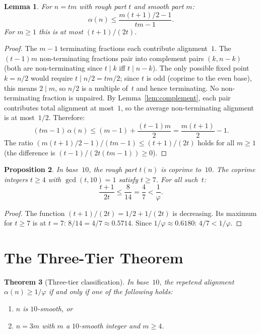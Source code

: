 \documentclass[12pt]{amsart}
\newtheorem{theorem}{Theorem}
\newtheorem{lemma}[theorem]{Lemma}
\newtheorem{proposition}[theorem]{Proposition}
\theoremstyle{definition}
\theoremstyle{remark}
\begin{document}
\begin{lemma}\label{lem:upper-bound}
For $n = tm$ with rough part $t$ and smooth part $m$:
\[
\alpha(n) \le \frac{m(t{+}1)/2 - 1}{tm - 1}.
\]
For $m \ge 1$ this is at most $(t{+}1)/(2t)$.
\end{lemma}

\begin{proof}
The $m - 1$ terminating fractions each contribute
alignment~$1$. The $(t{-}1)m$ non-terminating fractions
pair into complement pairs $(k, n{-}k)$ (both are
non-terminating since $t \mid k$ iff $t \mid n{-}k$).
The only possible fixed point $k = n/2$ would require
$t \mid n/2 = tm/2$; since $t$ is odd (coprime to
the even base), this means $2 \mid m$, so $n/2$ is a
multiple of~$t$ and hence terminating. No non-terminating
fraction is unpaired.
By Lemma~\ref{lem:complement}, each pair contributes
total alignment at most~$1$, so the average
non-terminating alignment is at most~$1/2$. Therefore:
\[
(tm{-}1)\,\alpha(n) \le (m{-}1) +
\frac{(t{-}1)m}{2} = \frac{m(t{+}1)}{2} - 1.
\]
The ratio $(m(t{+}1)/2 - 1)/(tm - 1) \le (t{+}1)/(2t)$
holds for all $m \ge 1$ (the difference is
$(t{-}1)/(2t(tm{-}1)) \ge 0$).
\end{proof}

\begin{proposition}\label{prop:threshold}
In base~$10$, the rough part $t(n)$ is coprime to~$10$.
The coprime integers $t \ge 4$ with $\gcd(t, 10) = 1$
satisfy $t \ge 7$. For all such~$t$:
\[
\frac{t+1}{2t} \le \frac{8}{14} = \frac{4}{7}
< \frac{1}{\varphi}.
\]
\end{proposition}

\begin{proof}
The function $(t{+}1)/(2t) = 1/2 + 1/(2t)$ is
decreasing. Its maximum for $t \ge 7$ is at $t = 7$:
$8/14 = 4/7 \approx 0.5714$. Since
$1/\varphi \approx 0.6180$: $4/7 < 1/\varphi$.
\end{proof}

\section{The Three-Tier Theorem}

\begin{theorem}[Three-tier classification]\label{thm:three-tier}
In base~$10$, the repetend alignment $\alpha(n) \ge 1/\varphi$
if and only if one of the following holds:
\begin{enumerate}
\item[\textup{(i)}] $n$ is $10$-smooth, or
\item[\textup{(ii)}] $n = 3m$ with $m$ a $10$-smooth integer and
      $m \ge 4$.
\end{enumerate}
\end{theorem}
\end{document}
